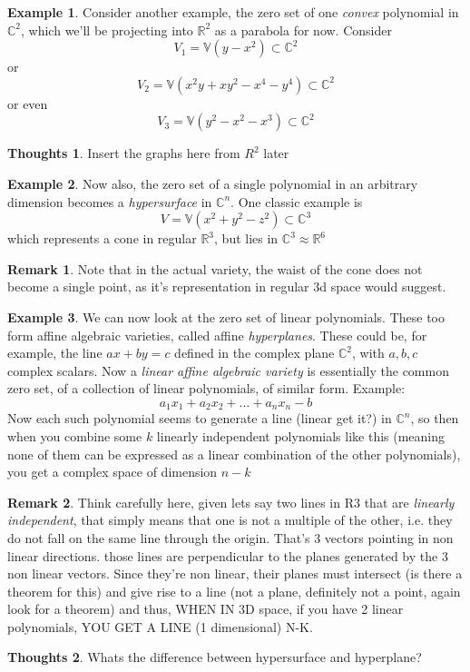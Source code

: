 \documentclass[12pt]{book}
\theoremstyle{definition}
\newtheorem{example}{Example}[chapter]
\newtheorem*{huh}{Thoughts}
\newtheorem*{remark}{Remark}
\begin{document}
\begin{example}
Consider another example, the zero set of one \textit{convex} polynomial in $\mathbb{C}^2$, which we'll be projecting into $\mathbb{R}^2$ as a parabola for now. Consider $$V_1 = \mathbb{V}(y - x^2) \subset \mathbb{C}^2$$ or 
$$V_2 = \mathbb{V}(x^2y + xy^2 - x^4 - y^4) \subset \mathbb{C}^2$$ or even
$$V_3 = \mathbb{V}(y^2 - x^2 - x^3) \subset \mathbb{C}^2$$
\begin{huh}
Insert the graphs here from $R^2$ later
\end{huh}
\end{example}
\begin{example}
Now also, the zero set of a single polynomial in an arbitrary dimension becomes a \textit{hypersurface} in $\mathbb{C}^n$. One classic example is $$V = \mathbb{V}(x^2 + y^2 - z^2) \subset \mathbb{C}^3$$ which represents a cone in regular $\mathbb{R}^3$, but lies in $\mathbb{C}^3 \approx \mathbb{R}^6$
\begin{remark}
Note that in the actual variety, the waist of the cone does not become a single point, as it's representation in regular 3d space would suggest.
\end{remark}
\end{example}
\begin{example}
We can now look at the zero set of linear polynomials. These too form affine algebraic varieties, called affine \textit{hyperplanes}. These could be, for example, the line $ax + by = c$ defined in the complex plane $\mathbb{C}^2$, with $a, b, c$ complex scalars.
Now a \textit{linear affine algebraic variety} is essentially the common zero set, of a collection of linear polynomials, of similar form. Example: $$a_1x_1 + a_2x_2 + \ldots + a_nx_n - b$$ Now each such polynomial seems to generate a line (linear get it?) in $\mathbb{C}^n$, so then when you combine some $k$ linearly independent polynomials like this (meaning none of them can be expressed as a linear combination of the other polynomials), you get a complex space of dimension $n-k$
\begin{remark}
Think carefully here, given lets say two lines in R3 that are \textit{linearly independent}, that simply means that one is not a multiple of the other, i.e. they do not fall on the same line through the origin. That's 3 vectors pointing in non linear directions. those lines are perpendicular to the planes generated by the 3 non linear vectors. Since they're non linear, their planes must intersect (is there a theorem for this) and give rise to a line (not a plane, definitely not a point, again look for a theorem) and thus, WHEN IN 3D space, if you have 2 linear polynomials, YOU GET A LINE (1 dimensional) N-K.
\end{remark}\begin{huh}
Whats the difference between hypersurface and hyperplane?
\end{huh}
\end{example}
\end{document}
